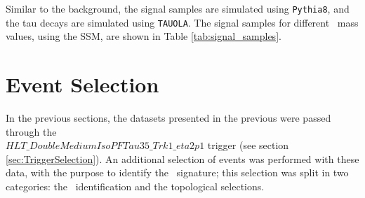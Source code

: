 \noindent Similar to the background, the signal samples are simulated using \texttt{Pythia8}, and the 
tau decays are simulated using \texttt{TAUOLA}. The signal samples for different \Zprime~mass values, using 
the SSM, are shown in Table \ref{tab:signal_samples}.

\section{Event Selection}
\label{sec:EventSelection}

In the previous sections, the datasets presented in the previous were passed 
through the \\ $HLT\_DoubleMediumIsoPFTau35\_Trk1\_eta2p1$ trigger
(see section \ref{sec:TriggerSelection}). An additional selection of events 
was performed with these data, with the purpose to identify the \Zprimetotauh~signature; this selection 
was split in two categories: the \tauh~identification and the topological selections.

